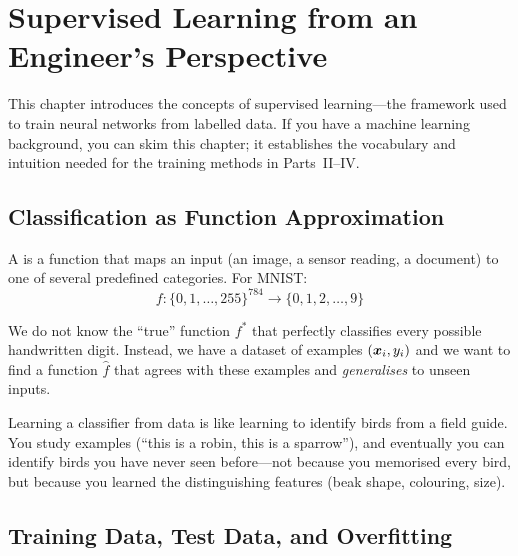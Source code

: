 \chapter{Supervised Learning from an Engineer's Perspective}
\label{ch:learning}

This chapter introduces the concepts of supervised learning---the
framework used to train neural networks from labelled data. If you
have a machine learning background, you can skim this chapter; it
establishes the vocabulary and intuition needed for the training
methods in Parts~II--IV.


\section{Classification as Function Approximation}
\label{sec:classification}

A  is a function that maps an input (an image,
a sensor reading, a document) to one of several predefined categories.
For MNIST:
\begin{equation}
  f : \{0, 1, \ldots, 255\}^{784} \to \{0, 1, 2, \ldots, 9\}
  \label{eq:classifier}
\end{equation}

We do not know the ``true'' function $f^*$ that perfectly classifies
every possible handwritten digit. Instead, we have a dataset of
examples $({\bm{x}_i, y_i})$ and we want to find a function
$\hat{f}$ that agrees with these examples and \emph{generalises} to
unseen inputs.

\begin{analogy}
Learning a classifier from data is like learning to identify birds from
a field guide. You study examples (``this is a robin, this is a
sparrow''), and eventually you can identify birds you have never seen
before---not because you memorised every bird, but because you learned
the distinguishing features (beak shape, colouring, size).
\end{analogy}


\section{Training Data, Test Data, and Overfitting}
\label{sec:overfitting}

